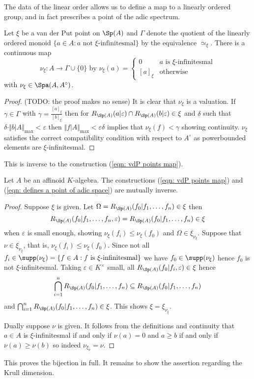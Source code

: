 The data of the linear order allows us to define a map to a linearly ordered group, and in fact prescribes a point of the adic spectrum. 
\begin{proposition}
    Let $\xi$ be a van der Put point on $\Sp(A)$ and $\Gamma$ denote the quotient of the linearly ordered monoid $\{a\in A:a\text{ not }\xi\text{-infinitesmal}\}$ by the equivalence $\simeq_{\xi}$. There is a continuous map 
    \begin{equation}\label{eqn: defines a point of adic space}
        \nu_{\xi}:A\to\Gamma\cup\{0\}\text{ by }\nu_{\xi}(a)=\begin{cases}
            0 & a\text{ is }\xi\text{-infinitesmal} \\
            [a]_{\xi} & \text{otherwise}
        \end{cases}
    \end{equation}
    with $\nu_{\xi}\in\Spa(A,A^{\circ})$. 
\end{proposition}
\begin{proof} (TODO: the proof makes no sense)
    It is clear that $\nu_{\xi}$ is a valuation. If $\gamma\in\Gamma$ with $\gamma=\frac{[a]_{\xi}}{[b]_{\xi}}$ then for $R_{\Sp(A)}(a|\varepsilon)\cap R_{\Sp(A)}(b|\varepsilon)\in\xi$ and $\delta$ such that $\delta\cdot\Vert b|A\Vert_{\max}<\varepsilon$ then $\Vert f|A\Vert_{\max}<\varepsilon\delta$ implies that $\nu_{\xi}(f)<\gamma$ showing continuity. $\nu_{\xi}$ satisfies the correct compatibility condition with respect to $A^{\circ}$ as powerbounded elements are $\xi$-infinitesmal. 
\end{proof}
This is inverse to the construction (\ref{eqn: vdP points map}). 
\begin{proposition}\label{prop: mutually inverse}
    Let $A$ be an affinoid $K$-algebra. The constructions (\ref{eqn: vdP points map}) and (\ref{eqn: defines a point of adic space}) are mutually inverse. 
\end{proposition}
\begin{proof}
    Suppose $\xi$ is given.
Let $\Omega=R_{\Sp(A)}(f_{0}|f_{1},\dots,f_{n})\in\xi$ then $$R_{\Sp(A)}(f_{0}|f_{1},\dots,f_{n},\varepsilon)=R_{\Sp(A)}(f_{0}|f_{1},\dots,f_{n})\in\xi$$ when $\varepsilon$ is small enough, showing $\nu_{\xi}(f_{i})\leq\nu_{\xi}(f_{0})$ and $\Omega\in\xi_{\nu_{\xi}}$. Suppose that $\nu\in\xi_{\nu_\xi}$, that is, $\nu_{\xi}(f_{i})\leq\nu_{\xi}(f_{0})$. Since not all $f_{i}\in\supp(\nu_{\xi})=\{f\in A:f\text{ is }\xi\text{-infinitesmal}\}$ we have $f_{0}\in\supp(\nu_{\xi})$ hence $f_{0}$ is not $\xi$-infinitesmal. Taking $\varepsilon\in K^{\times}$ small, all $R_{\Sp(A)}(f_{0}|f_{i},\varepsilon)\in\xi$ hence 
    $$\bigcap_{i=1}^{n}R_{\Sp(A)}(f_{0}|f_{1},\dots,f_{n})\subseteq R_{\Sp(A)}(f_{0}|f_{1},\dots,f_{n})$$ and $\bigcap_{i=1}^{n}R_{\Sp(A)}(f_{0}|f_{1},\dots,f_{n})\in\xi$. This shows $\xi=\xi_{\nu_{\xi}}$. 

    Dually suppose $\nu$ is given. It follows from the definitions and continuity that $a\in A$ is $\xi$-infinitesmal if and only if $\nu(a)=0$ and $a\geq b$ if and only if $\nu(a)\geq \nu(b)$ so indeed $\nu_{\xi_\nu}=\nu$. 
\end{proof}
This proves the bijection in full. It remains to show the assertion regarding the Krull dimension. 

